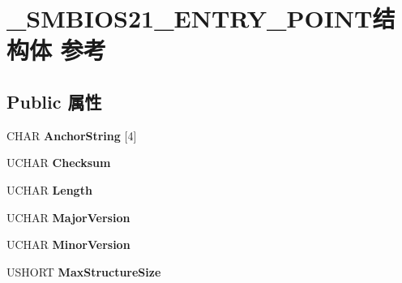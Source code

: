\hypertarget{struct___s_m_b_i_o_s21___e_n_t_r_y___p_o_i_n_t}{}\section{\+\_\+\+S\+M\+B\+I\+O\+S21\+\_\+\+E\+N\+T\+R\+Y\+\_\+\+P\+O\+I\+N\+T结构体 参考}
\label{struct___s_m_b_i_o_s21___e_n_t_r_y___p_o_i_n_t}
\subsection*{Public 属性}
\begin{DoxyCompactItemize}
\item 
\mbox{\label{struct___s_m_b_i_o_s21___e_n_t_r_y___p_o_i_n_t_a9e530b2c0576c058618336c0b888bcaa}} 
C\+H\+AR {\bfseries Anchor\+String} \mbox{[}4\mbox{]}
\item 
\mbox{\label{struct___s_m_b_i_o_s21___e_n_t_r_y___p_o_i_n_t_a37d69678814054d1e716a1e53db3f09a}} 
U\+C\+H\+AR {\bfseries Checksum}
\item 
\mbox{\label{struct___s_m_b_i_o_s21___e_n_t_r_y___p_o_i_n_t_a6f97bbdd3f392c1a60fa281492786b2d}} 
U\+C\+H\+AR {\bfseries Length}
\item 
\mbox{\label{struct___s_m_b_i_o_s21___e_n_t_r_y___p_o_i_n_t_ab94f18784c0bafe4f2dbb617e1f25246}} 
U\+C\+H\+AR {\bfseries Major\+Version}
\item 
\mbox{\label{struct___s_m_b_i_o_s21___e_n_t_r_y___p_o_i_n_t_aa7bdb0b8400972392d4016ae337c134d}} 
U\+C\+H\+AR {\bfseries Minor\+Version}
\item 
\mbox{\label{struct___s_m_b_i_o_s21___e_n_t_r_y___p_o_i_n_t_a243a79e2fd3d84ce10e7f470a60f341d}} 
U\+S\+H\+O\+RT {\bfseries Max\+Structure\+Size}
\item 
\mbox{\label{struct___s_m_b_i_o_s21___e_n_t_r_y___p_o_i_n_t_ac8ea173788faecd02b437657a5dfff92}} 

\end{DoxyCompactItemize}
